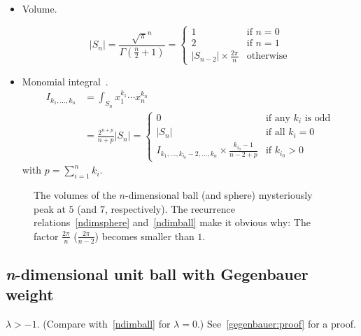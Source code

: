 \documentclass[draft]{scrartcl}
\begin{document}
\begin{itemize}
  \item Volume.

\begin{equation}\label{ndimball}
  |S_n|
  = \frac{\sqrt{\pi}^n}{\Gamma(\frac{n}{2}+1)}
  = \begin{cases}
     1&\text{if $n = 0$}\\
     2&\text{if $n = 1$}\\
     |S_{n-2}| \times \frac{2\pi}{n}&\text{otherwise}
  \end{cases}
\end{equation}

\item Monomial integral~\cite{folland}.
\begin{align}\nonumber
  I_{k_1,\dots,k_n}
  &= \int_{S_n} x_1^{k_1}\cdots x_n^{k_n}\\
  &= \frac{2^{n + p}}{n + p} |S_n|
  =\begin{cases}
    0&\text{if any $k_i$ is odd}\\
    |S_n|&\text{if all $k_i=0$}\\
    I_{k_1,\dots,k_{i_0}-2,\dots,k_n} \times \frac{k_{i_0} - 1}{n - 2 + p}&\text{if $k_{i_0} > 0$}
  \end{cases}
\end{align}
with $p=\sum_{i=1}^n k_i$.
\end{itemize}

\begin{figure}
\centering

  \caption{The volumes of the $n$-dimensional ball (and sphere) mysteriously peak at $5$
  (and $7$, respectively). The recurrence relations~\eqref{ndimsphere}
  and~\eqref{ndimball} make it obvious why: The factor $\frac{2\pi}{n}$
  ($\frac{2\pi}{n-2}$) becomes smaller than $1$.}
\end{figure}

\subsection*{\textit{n}-dimensional unit ball with Gegenbauer weight}
  $\lambda > -1$. (Compare with~\eqref{ndimball} for $\lambda = 0$.)
  See~\ref{gegenbauer:proof} for a proof.
\end{document}
